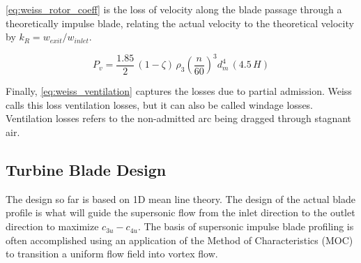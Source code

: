 \cref{eq:weiss_rotor_coeff} is the loss of velocity along the blade passage through a theoretically impulse blade, relating the actual velocity to the theoretical velocity by $k_R=w_{exit}/w_{inlet}$.

\begin{equation}
    P_v = \frac{1.85}{2}\,(1 - \zeta)\,\rho_3 \left( \frac{n}{60} \right)^{3} d_m^4 \,(4.5\,H)
    \label{eq:weiss_ventilation}
\end{equation}

Finally, \cref{eq:weiss_ventilation} captures the losses due to partial admission. Weiss calls this loss ventilation losses, but it can also be called windage losses. Ventilation losses refers to the non-admitted arc being dragged through stagnant air.




\subsection{Turbine Blade Design}

The design so far is based on 1D mean line theory. The design of the actual blade profile is what will guide the supersonic flow from the inlet direction to the outlet direction to maximize $c_{3u}-c_{4u}$. The basis of supersonic impulse blade profiling is often accomplished using an application of the Method of Characteristics (MOC) to transition a uniform flow field into vortex flow.

